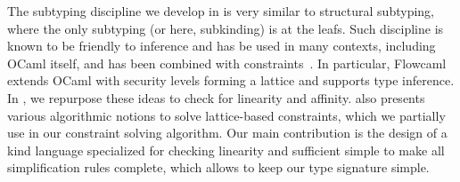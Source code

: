 The subtyping discipline we develop in \lang is very similar
to structural subtyping, where the only subtyping (or here, subkinding)
is at the leafs.
Such discipline is known to be friendly to inference and has be used in many
contexts, including OCaml itself, and has been combined
with constraints~\citet{DBLP:journals/tapos/OderskySW99,DBLP:conf/sas/TrifonovS96}.
In particular, Flowcaml~\citep{DBLP:conf/popl/PottierS02}
extends OCaml with security levels forming a lattice and supports type inference.
In \lang, we repurpose these ideas to check for linearity and affinity.
\citet{DBLP:conf/aplas/Simonet03} also presents various algorithmic
notions to solve lattice-based constraints, which we partially use
in our constraint solving algorithm. Our main contribution
is the design of a kind language specialized for checking linearity
and sufficient simple to make
all simplification rules complete, which allows to keep our type signature simple.


